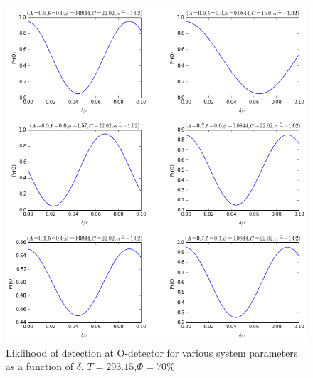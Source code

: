 \begin{figure}[ht!]
\centering
\includegraphics[scale=0.7]{Figures/likelihoods.png}
\caption{Liklihood of detection at O-detector for various system parameters as a function of $\delta$, $T=293.15$,$\Phi=70\%$}
\label{fig:likelihoods}
\end{figure}

